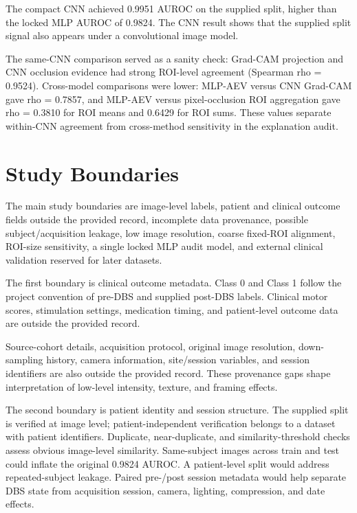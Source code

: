 The compact CNN achieved 0.9951 AUROC on the supplied split, higher than the locked MLP AUROC of 0.9824. The CNN result shows that the supplied split signal also appears under a convolutional image model.


The same-CNN comparison served as a sanity check: Grad-CAM projection and CNN occlusion evidence had strong ROI-level agreement (Spearman rho = 0.9524). Cross-model comparisons were lower: MLP-AEV versus CNN Grad-CAM gave rho = 0.7857, and MLP-AEV versus pixel-occlusion ROI aggregation gave rho = 0.3810 for ROI means and 0.6429 for ROI sums. These values separate within-CNN agreement from cross-method sensitivity in the explanation audit.


\section{Study Boundaries}

The main study boundaries are image-level labels, patient and clinical outcome fields outside the provided record, incomplete data provenance, possible subject/acquisition leakage, low image resolution, coarse fixed-ROI alignment, ROI-size sensitivity, a single locked MLP audit model, and external clinical validation reserved for later datasets.


The first boundary is clinical outcome metadata. Class 0 and Class 1 follow the project convention of pre-DBS and supplied post-DBS labels. Clinical motor scores, stimulation settings, medication timing, and patient-level outcome data are outside the provided record.


Source-cohort details, acquisition protocol, original image resolution, down-sampling history, camera information, site/session variables, and session identifiers are also outside the provided record. These provenance gaps shape interpretation of low-level intensity, texture, and framing effects.


The second boundary is patient identity and session structure. The supplied split is verified at image level; patient-independent verification belongs to a dataset with patient identifiers. Duplicate, near-duplicate, and similarity-threshold checks assess obvious image-level similarity. Same-subject images across train and test could inflate the original 0.9824 AUROC. A patient-level split would address repeated-subject leakage. Paired pre-/post session metadata would help separate DBS state from acquisition session, camera, lighting, compression, and date effects.


